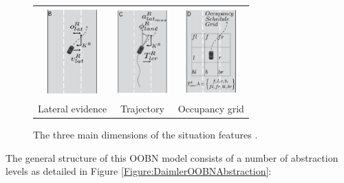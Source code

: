 \begin{figure}[ht!]
\begin{center}
\begin{tabular}{ccc}
\includegraphics[width=2cm]{./figures/DaimlerLEHipothesis} &

\includegraphics[width=2cm]{./figures/DaimlerTRAJHipothesis} &

\includegraphics[width=2cm]{./figures/DaimlerOCCGRIDHipothesis} \\

Lateral evidence & Trajectory & Occupancy grid \\
\end{tabular}
\caption{\label{Figure:DaimlerSituationFeatures} The three main dimensions of the situation features \cite{kasper2012object}.}
\end{center}
\end{figure}

The general structure of this OOBN model consists of a number of abstraction levels as detailed in Figure \ref{Figure:DaimlerOOBNAbstraction}: 

